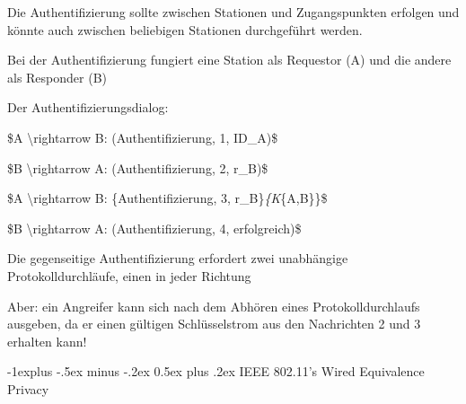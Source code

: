 \documentclass[a4paper]{article}
\makeatletter
\renewcommand{\subsection}{\@startsection{subsection}{2}{0mm}%
 {-1explus -.5ex minus -.2ex}%
 {0.5ex plus .2ex}%
 {\normalfont\normalsize\bfseries}}
\makeatother
\begin{document}
\begin{multicols}{3}
      \begin{itemize*}
            \item Die Authentifizierung sollte zwischen Stationen und Zugangspunkten
            erfolgen und könnte auch zwischen beliebigen Stationen durchgeführt
            werden.
            \item Bei der Authentifizierung fungiert eine Station als Requestor (A) und
            die andere als Responder (B)
            \item Der Authentifizierungsdialog:
            \begin{enumerate*}
                  \def\labelenumi{\arabic{enumi}.}
                  \item \$A \textbackslash rightarrow B: (Authentifizierung, 1, ID\_A)\$
                  \item \$B \textbackslash rightarrow A: (Authentifizierung, 2, r\_B)\$
                  \item \$A \textbackslash rightarrow B: \{Authentifizierung, 3, r\_B\}\emph{\{K}\{A,B\}\}\$
                  \item \$B \textbackslash rightarrow A: (Authentifizierung, 4, erfolgreich)\$
            \end{enumerate*}
            \item Die gegenseitige Authentifizierung erfordert zwei unabhängige
            Protokolldurchläufe, einen in jeder Richtung
            \item Aber: ein Angreifer kann sich nach dem Abhören eines
            Protokolldurchlaufs ausgeben, da er einen gültigen Schlüsselstrom aus
            den Nachrichten 2 und 3 erhalten kann!
      \end{itemize*}


      \subsection{IEEE 802.11's Wired Equivalence
            Privacy}


\end{multicols}
\end{document}
